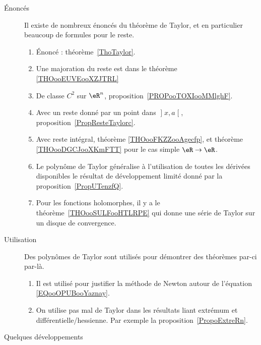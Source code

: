 	\label{THEMEooPolynomeTaylor}

\begin{description}
	\item[Énoncés]

		Il existe de nombreux énoncés du théorème de Taylor, et en particulier beaucoup de formules pour le reste.

		\begin{enumerate}
			\item
			      Énoncé : théorème~\ref{ThoTaylor}.
			\item
			      Une majoration du reste est dans le théorème \ref{THOooEUVEooXZJTRL}
			\item
			      De classe \( C^2\) sur \( \eR^n\), proposition~\ref{PROPooTOXIooMMlghF}.
			\item
			      Avec un reste donné par un point dans \( \mathopen] x , a \mathclose[\), proposition~\ref{PropResteTaylorc}.
			\item
			      Avec reste intégral, théorème \ref{THOooFKZZooAgecfp}, et théorème \ref{THOooDGCJooXKmFTT} pour le cas simple \( \eR\to \eR\).
			\item
			      Le polynôme de Taylor généralise à l'utilisation de toutes les dérivées disponibles le résultat de développement limité donné par la proposition~\ref{PropUTenzfQ}.
			\item
			      Pour les fonctions holomorphes, il y a le théorème~\ref{THOooSULFooHTLRPE} qui donne une série de Taylor sur un disque de convergence.
		\end{enumerate}

	\item[Utilisation]

		Des polynômes de Taylor sont utilisés pour démontrer des théorèmes par-ci par-là.

		\begin{enumerate}
			\item
			      Il est utilisé pour justifier la méthode de Newton autour de l'équation \eqref{EQooOPUBooYaznay}.
			\item
			      On utilise pas mal de Taylor dans les résultats liant extrémum et différentielle/hessienne. Par exemple la proposition~\ref{PropoExtreRn}.
		\end{enumerate}

	\item[Quelques développements]


\end{description}
